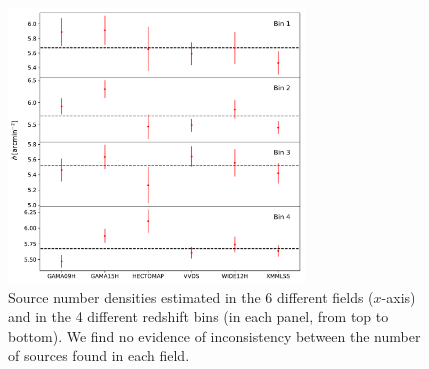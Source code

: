 \documentclass[a4paper,11pt]{article}
\begin{document}
      \begin{figure}
        \centering
        \includegraphics[width=0.7\textwidth]{figures/ndens_consistency.pdf}
        \caption{Source number densities estimated in the 6 different fields ($x$-axis) and in the 4 different redshift bins (in each panel, from top to bottom). We find no evidence of inconsistency between the number of sources found in each field.}
        \label{fig:ndens_consistency}
      \end{figure}
\end{document}
